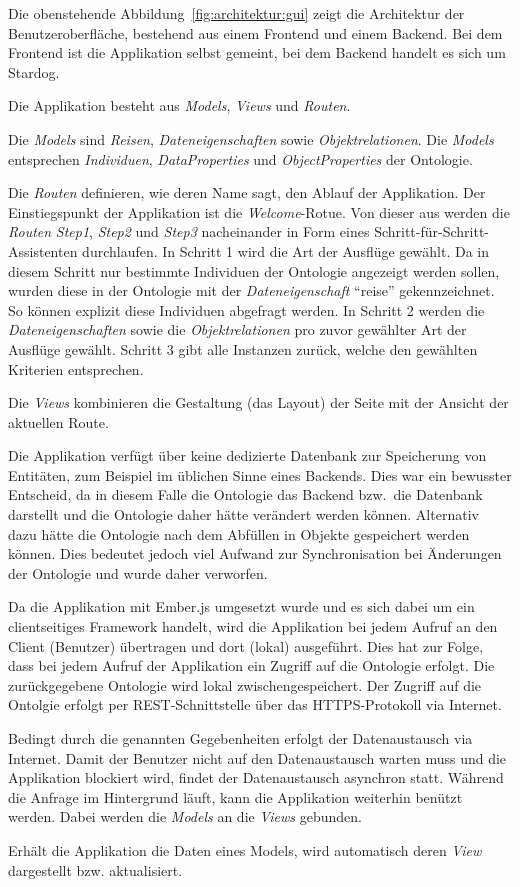 Die obenstehende Abbildung~\ref{fig:architektur:gui} zeigt die Architektur der Benutzeroberfläche, bestehend aus einem Frontend und einem Backend. Bei dem Frontend ist die Applikation selbst gemeint, bei dem Backend handelt es sich um Stardog.

Die Applikation besteht aus \textit{Models}, \textit{Views} und \textit{Routen}.

Die \textit{Models} sind \textit{Reisen}, \textit{Dateneigenschaften} sowie \textit{Objektrelationen}. Die \textit{Models} entsprechen \textit{Individuen}, \textit{DataProperties} und \textit{ObjectProperties} der Ontologie.

Die \textit{Routen} definieren, wie deren Name sagt, den Ablauf der Applikation. Der Einstiegspunkt der Applikation ist die \textit{Welcome}-Rotue. Von dieser aus werden die \textit{Routen} \textit{Step1}, \textit{Step2} und \textit{Step3} nacheinander in Form eines Schritt-für-Schritt-Assistenten durchlaufen. In Schritt 1 wird die Art der Ausflüge gewählt. Da in diesem Schritt nur bestimmte Individuen der Ontologie angezeigt werden sollen, wurden diese in der Ontologie mit der \textit{Dateneigenschaft} ``reise'' gekennzeichnet. So können explizit diese Individuen abgefragt werden. In Schritt 2 werden die \textit{Dateneigenschaften} sowie die \textit{Objektrelationen} pro zuvor gewählter Art der Ausflüge gewählt. Schritt 3 gibt alle Instanzen zurück, welche den gewählten Kriterien entsprechen.

Die \textit{Views} kombinieren die Gestaltung (das Layout) der Seite mit der Ansicht der aktuellen Route.

Die Applikation verfügt über keine dedizierte Datenbank zur Speicherung von Entitäten, zum Beispiel im üblichen Sinne eines Backends. Dies war ein bewusster Entscheid, da in diesem Falle die Ontologie das Backend bzw.\ die Datenbank darstellt und die Ontologie daher hätte verändert werden können. Alternativ dazu hätte die Ontologie nach dem Abfüllen in Objekte gespeichert werden können. Dies bedeutet jedoch viel Aufwand zur Synchronisation bei Änderungen der Ontologie und wurde daher verworfen.

Da die Applikation mit Ember.js umgesetzt wurde und es sich dabei um ein clientseitiges Framework handelt, wird die Applikation bei jedem Aufruf an den Client (Benutzer) übertragen und dort (lokal) ausgeführt. Dies hat zur Folge, dass bei jedem Aufruf der Applikation ein Zugriff auf die Ontologie erfolgt. Die zurückgegebene Ontologie wird lokal zwischengespeichert. Der Zugriff auf die Ontolgie erfolgt per REST-Schnittstelle über das HTTPS-Protokoll via Internet.

Bedingt durch die genannten Gegebenheiten erfolgt der Datenaustausch via Internet. Damit der Benutzer nicht auf den Datenaustausch warten muss und die Applikation blockiert wird, findet der Datenaustausch asynchron statt. Während die Anfrage im Hintergrund läuft, kann die Applikation weiterhin benützt werden. Dabei werden die \textit{Models} an die \textit{Views} gebunden. 

Erhält die Applikation die Daten eines Models, wird automatisch deren \textit{View} dargestellt bzw. aktualisiert.
